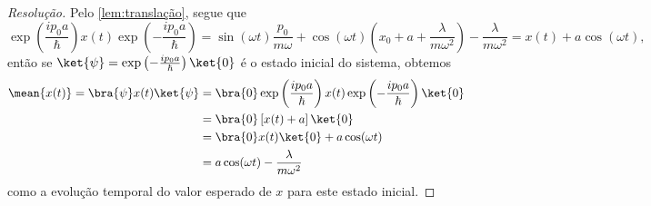 \begin{proof}[Resolução]
    Pelo \cref{lem:translação}, segue que
    \begin{equation*}
        \exp\left(\frac{i p_0 a}{\hbar}\right)x(t) \exp\left(-\frac{i p_0 a}{\hbar}\right) = \sin(\omega t) \frac{p_0}{m \omega}+ \cos(\omega t) \left(x_0 + a + \frac{\lambda}{m \omega^2}\right) - \frac{\lambda}{m \omega^2} = x(t) + a \cos(\omega t),
    \end{equation*}
    então se \(\ket{\psi} = \exp\left(-\frac{i p_0 a}{\hbar}\right)\ket{0}\) é o estado inicial do sistema, obtemos
    \begin{align*}
        \mean{x(t)} = \bra{\psi}x(t)\ket{\psi} &= \bra{0} \exp\left(\frac{i p_0 a}{\hbar}\right) x(t) \exp\left(-\frac{i p_0 a}{\hbar}\right)\ket{0}\\
                                               &= \bra{0} \left[x(t) + a\right]\ket{0}\\
                                               &= \bra{0} x(t) \ket{0} + a \cos(\omega t)\\
                                               &= a \cos(\omega t) - \frac{\lambda}{m \omega^2}
    \end{align*}
    como a evolução temporal do valor esperado de \(x\) para este estado inicial. 
\end{proof}
